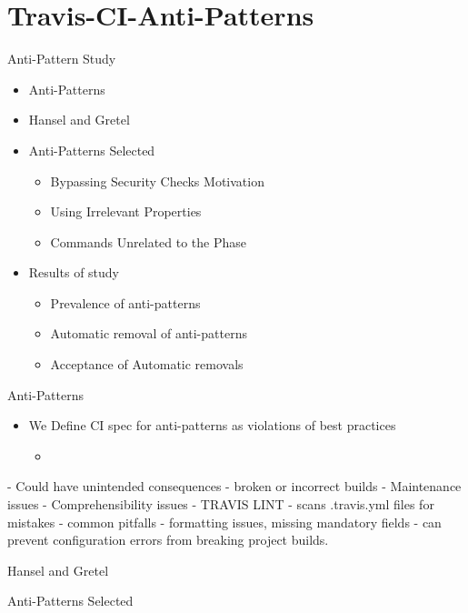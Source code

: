 \documentclass[aspectratio=169,xcolor=dvipsnames]{beamer}
\begin{document}
\section{Travis-CI-Anti-Patterns}
\begin{frame}{Anti-Pattern Study}

    \begin{itemize}
        \item Anti-Patterns
        \item Hansel and Gretel 
        \item Anti-Patterns Selected
        \begin{itemize}
            \item Bypassing Security Checks Motivation
            \item Using Irrelevant Properties
            \item Commands Unrelated to the Phase
        \end{itemize}
        \item Results of study
        \begin{itemize}
            \item Prevalence of anti-patterns
            \item Automatic removal of anti-patterns
            \item Acceptance of Automatic removals
        \end{itemize}
    \end{itemize}
\end{frame}
\begin{frame}{Anti-Patterns}
    \begin{itemize}
        \item We Define CI spec for anti-patterns as violations of best practices
        \begin{itemize}
            \item 
        \end{itemize}
    \end{itemize}
    - Could have unintended consequences
	-  broken or incorrect builds
	- Maintenance issues
	- Comprehensibility issues
- TRAVIS LINT
	- scans .travis.yml files for mistakes
	- common pitfalls
	- formatting issues, missing mandatory fields
	-  can prevent configuration errors from breaking project builds.
\end{frame}

\begin{frame}{Hansel and Gretel}
    
\end{frame}
\begin{frame}{Anti-Patterns Selected}
    
\end{frame}
\end{document}
